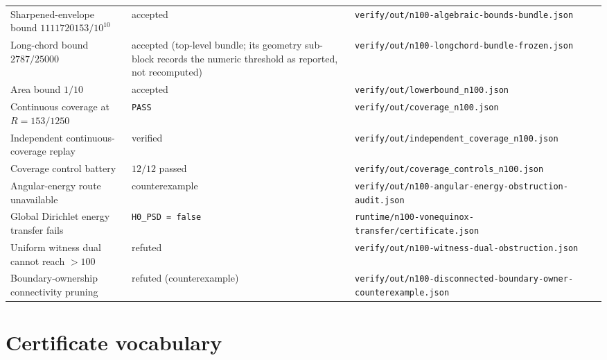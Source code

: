 {\begin{longtable}{@{}@{}>{\raggedright\arraybackslash}p{}>{\raggedright\arraybackslash}p{}>{\raggedright\arraybackslash}p{}@{}}
Sharpened-envelope bound $1111720153/10^{10}$ & accepted &
\texttt{verify/\allowbreak{}out/\allowbreak{}n100-\allowbreak{}algebraic-\allowbreak{}bounds-\allowbreak{}bundle.json} \\
Long-chord bound $2787/25000$ & accepted (top-level bundle; its geometry sub-block records the
numeric threshold as reported, not recomputed) &
\texttt{verify/\allowbreak{}out/\allowbreak{}n100-\allowbreak{}longchord-\allowbreak{}bundle-\allowbreak{}frozen.json} \\
Area bound $1/10$ & accepted & \texttt{verify/\allowbreak{}out/\allowbreak{}lowerbound\_\allowbreak{}n100.json} \\
Continuous coverage at $R=153/1250$ & \texttt{PASS} &
\texttt{verify/\allowbreak{}out/\allowbreak{}coverage\_\allowbreak{}n100.json} \\
Independent continuous-coverage replay & verified &
\texttt{verify/\allowbreak{}out/\allowbreak{}independent\_\allowbreak{}coverage\_\allowbreak{}n100.json} \\
Coverage control battery & $12/12$ passed &
\texttt{verify/\allowbreak{}out/\allowbreak{}coverage\_\allowbreak{}controls\_\allowbreak{}n100.json} \\
Angular-energy route unavailable & counterexample & {\footnotesize\texttt{verify/\allowbreak{}out/\allowbreak{}n100-\allowbreak{}angular-\allowbreak{}energy-\allowbreak{}obstruction-\allowbreak{}audit.json}} \\
Global Dirichlet energy transfer fails & \texttt{H0\_\allowbreak{}PSD = false} &
\texttt{runtime/\allowbreak{}n100-\allowbreak{}vonequinox-\allowbreak{}transfer/\allowbreak{}certificate.json} \\
Uniform witness dual cannot reach $>100$ & refuted &
{\footnotesize\texttt{verify/\allowbreak{}out/\allowbreak{}n100-\allowbreak{}witness-\allowbreak{}dual-\allowbreak{}obstruction.json}} \\
Boundary-ownership connectivity pruning & refuted (counterexample) &
{\footnotesize\texttt{verify/\allowbreak{}out/\allowbreak{}n100-\allowbreak{}disconnected-\allowbreak{}boundary-\allowbreak{}owner-\allowbreak{}counterexample.json}} \\
\end{longtable}}


\section{Certificate vocabulary}

